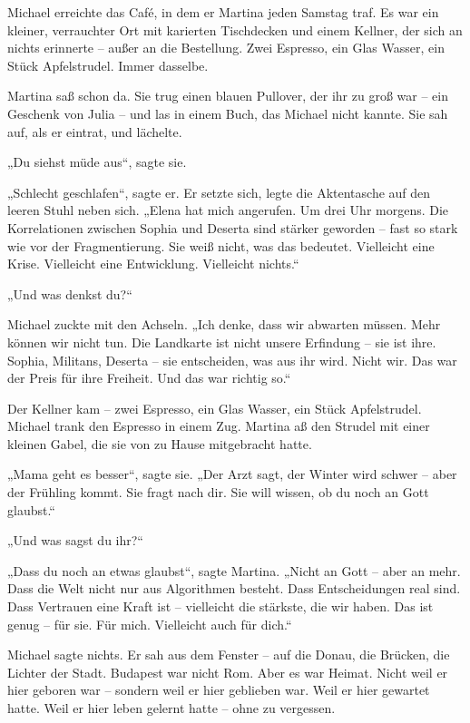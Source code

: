 \documentclass[
]{article}
\begin{document}
Michael erreichte das Café, in dem er Martina jeden Samstag traf. Es war ein kleiner, verrauchter Ort mit karierten Tischdecken und einem Kellner, der sich an nichts erinnerte -- außer an die Bestellung. Zwei Espresso, ein Glas Wasser, ein Stück Apfelstrudel. Immer dasselbe.

Martina saß schon da. Sie trug einen blauen Pullover, der ihr zu groß war -- ein Geschenk von Julia -- und las in einem Buch, das Michael nicht kannte. Sie sah auf, als er eintrat, und lächelte.

„Du siehst müde aus``, sagte sie.

„Schlecht geschlafen``, sagte er. Er setzte sich, legte die Aktentasche auf den leeren Stuhl neben sich. „Elena hat mich angerufen. Um drei Uhr morgens. Die Korrelationen zwischen Sophia und Deserta sind stärker geworden -- fast so stark wie vor der Fragmentierung. Sie weiß nicht, was das bedeutet. Vielleicht eine Krise. Vielleicht eine Entwicklung. Vielleicht nichts.``

„Und was denkst du?{\kern0pt}``

Michael zuckte mit den Achseln. „Ich denke, dass wir abwarten müssen. Mehr können wir nicht tun. Die Landkarte ist nicht unsere Erfindung -- sie ist ihre. Sophia, Militans, Deserta -- sie entscheiden, was aus ihr wird. Nicht wir. Das war der Preis für ihre Freiheit. Und das war richtig so.``

Der Kellner kam -- zwei Espresso, ein Glas Wasser, ein Stück Apfelstrudel. Michael trank den Espresso in einem Zug. Martina aß den Strudel mit einer kleinen Gabel, die sie von zu Hause mitgebracht hatte.

„Mama geht es besser``, sagte sie. „Der Arzt sagt, der Winter wird schwer -- aber der Frühling kommt. Sie fragt nach dir. Sie will wissen, ob du noch an Gott glaubst.``

„Und was sagst du ihr?{\kern0pt}``

„Dass du noch an etwas glaubst``, sagte Martina. „Nicht an Gott -- aber an mehr. Dass die Welt nicht nur aus Algorithmen besteht. Dass Entscheidungen real sind. Dass Vertrauen eine Kraft ist -- vielleicht die stärkste, die wir haben. Das ist genug -- für sie. Für mich. Vielleicht auch für dich.``

Michael sagte nichts. Er sah aus dem Fenster -- auf die Donau, die Brücken, die Lichter der Stadt. Budapest war nicht Rom. Aber es war Heimat. Nicht weil er hier geboren war -- sondern weil er hier geblieben war. Weil er hier gewartet hatte. Weil er hier leben gelernt hatte -- ohne zu vergessen.
\end{document}
